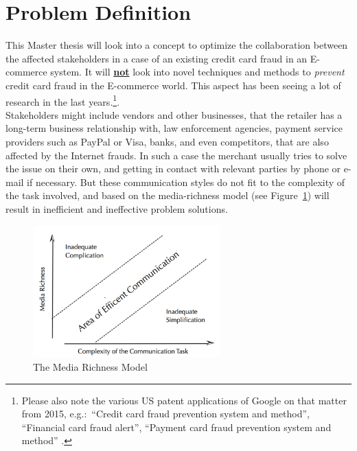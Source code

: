 
\section{Problem Definition}
\label{sec:problem_definition}

This Master thesis will look into a concept to optimize the collaboration between the affected stakeholders in a case of an existing credit card fraud in an \gls{E-commerce} system. It will \textbf{\underline{not}} look into novel techniques and methods to \textit{prevent} credit card fraud in the \gls{E-commerce} world. This aspect has been seeing a lot of research in the last years.\footnote{Please also note the various US patent applications of Google on that matter from 2015, e.g.:\ “Credit card fraud prevention system and method”, “Financial card fraud alert”, “Payment card fraud prevention system and method” \citep{GooglePatents2015}.}. \\

Stakeholders might include vendors and other businesses, that the retailer has a long-term business relationship with, law enforcement agencies, payment service providers such as PayPal or Visa, banks, and even competitors, that are also affected by the Internet frauds. In such a case the merchant usually tries to solve the issue on their own, and getting in contact with relevant parties by phone or e-mail if necessary. But these communication styles do not fit to the complexity of the task involved, and based on the media-richness model (see Figure~\ref{fig:images_media_richness_model}) will result in inefficient and ineffective problem solutions. \\

\begin{figure}[!ht]
	\centering
		\includegraphics[height=2in]{images/media-richness-model.png}
	\caption{The Media Richness Model \citep{Rice1992}}
\label{fig:images_media_richness_model}
\end{figure}

